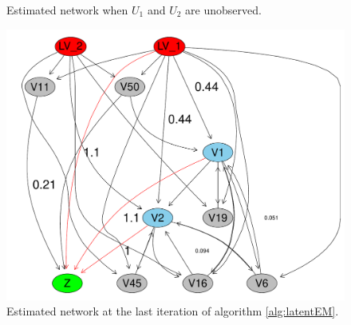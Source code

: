 \documentclass{article}
\begin{document}
\begin{figure}[h!]
\begin{minipage}[t]{0.3\linewidth}
     \caption{\label{fig_missing} Estimated network when $U_1$ and
      $U_2$ are unobserved.}
   \end{minipage}\hfill
   \begin{minipage}[t]{0.3\linewidth }
    \includegraphics[width=\linewidth]{./images/estimated_network_infered.pdf}
    \caption{\label{fig_estnet_infered} Estimated network at the last
      iteration of algorithm \ref{alg:latentEM}.}
  \end{minipage}
\end{figure}
\end{document}
